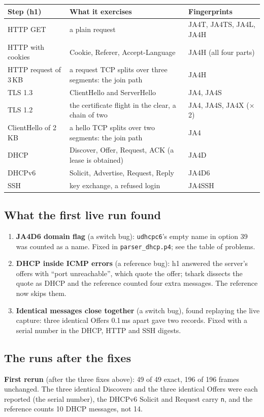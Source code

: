 \documentclass[11pt,a4paper]{article}
\newcommand{\code}[1]{\texttt{#1}}
\begin{document}
\begin{tabularx}{\textwidth}{l X l}
\toprule
\textbf{Step (h1)} & \textbf{What it exercises} & \textbf{Fingerprints} \\
\midrule
HTTP GET & a plain request & JA4T, JA4TS, JA4L, JA4H \\
HTTP with cookies & Cookie, Referer, Accept-Language & JA4H (all four parts) \\
HTTP request of 3\,KB & a request TCP splits over three segments: the join path & JA4H \\
TLS 1.3 & ClientHello and ServerHello & JA4, JA4S \\
TLS 1.2 & the certificate flight in the clear, a chain of two & JA4, JA4S, JA4X ($\times$2) \\
ClientHello of 2\,KB & a hello TCP splits over two segments: the join path & JA4 \\
DHCP & Discover, Offer, Request, ACK (a lease is obtained) & JA4D \\
DHCPv6 & Solicit, Advertise, Request, Reply & JA4D6 \\
SSH & key exchange, a refused login & JA4SSH \\
\bottomrule
\end{tabularx}

\subsection*{What the first live run found}
\begin{enumerate}
\item \textbf{JA4D6 domain flag} (a switch bug): \code{udhcpc6}'s empty name in option 39 was counted as a name.
  Fixed in \code{parser\_dhcp.p4}; see the table of problems.
\item \textbf{DHCP inside ICMP errors} (a reference bug): h1 answered the server's offers with ``port unreachable'',
  which quote the offer; tshark dissects the quote as DHCP and the reference counted four extra messages. The
  reference now skips them.
\item \textbf{Identical messages close together} (a switch bug), found replaying the live capture: three identical
  Offers 0.1\,ms apart gave two records. Fixed with a serial number in the DHCP, HTTP and SSH digests.
\end{enumerate}

\subsection*{The runs after the fixes}
\textbf{First rerun} (after the three fixes above): 49 of 49 exact, 196 of 196 frames unchanged. The three identical
Discovers and the three identical Offers were each reported (the serial number), the DHCPv6 Solicit and Request
carry \code{n}, and the reference counts 10 DHCP messages, not 14.
\end{document}
